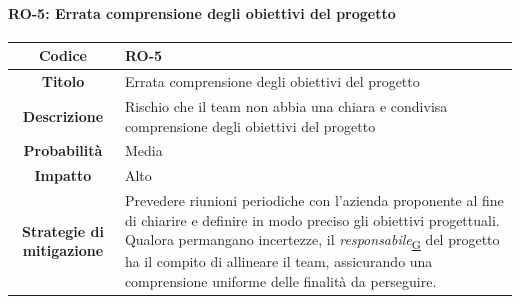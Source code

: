 \documentclass[a4paper,12pt]{article}
\begin{document}
{{            \paragraph{RO-5: Errata comprensione degli obiettivi del progetto}\mbox{}{    
                \begin{longtable}{|c|p{11cm}|}
                    \hline
                    \textbf{Codice} & RO-5 \\
                    \hline
                    \textbf{Titolo} & Errata comprensione degli obiettivi del progetto \\
                    \hline
                    \textbf{Descrizione} & Rischio che il team non abbia una chiara e condivisa comprensione degli obiettivi del progetto \\
                    \hline
                    \textbf{Probabilità} & Media \\
                    \hline
                    \textbf{Impatto} & Alto \\
                    \hline
                    \textbf{Strategie di mitigazione} & Prevedere riunioni periodiche con l'azienda proponente al fine di chiarire e definire in modo preciso gli obiettivi progettuali.
                        Qualora permangano incertezze, il \textit{responsabile}\textsubscript{\href{https://atlasteam9.github.io/Atlas/glossario.html\#Responsabile}{G}} del progetto ha il compito di allineare il team, assicurando una comprensione uniforme delle finalità da perseguire. \\
                    \hline
                \end{longtable}
            }

}}
\end{document}
